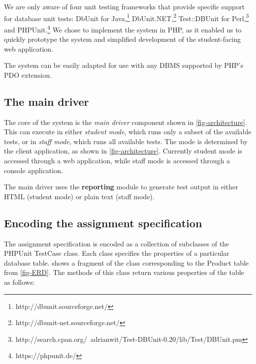\documentclass[sigconf, authordraft, capitalise]{acmart}
\begin{document}
We are only aware of four unit testing frameworks that provide specific support for database unit tests: DbUnit for Java,\footnote{http://dbunit.sourceforge.net/} DbUnit.NET,\footnote{http://dbunit-net.sourceforge.net/} Test::DBUnit for Perl,\footnote{http://search.cpan.org/~adrianwit/Test-DBUnit-0.20/lib/Test/DBUnit.pm} and PHPUnit.\footnote{https://phpunit.de/} We chose to implement the system in PHP, as it enabled us to quickly prototype the system and simplified development of the student-facing web application.

The system can be easily adapted for use with any DBMS supported by PHP's PDO extension.


\subsection{The main driver}

The core of the system is the \emph{main driver} component shown in \cref{fig-architecture}. This can execute in either \emph{student mode}, which runs only a subset of the available tests, or in \emph{staff mode}, which runs all available tests. The mode is determined by the client application, as shown in \ref{fig-architecture}. Currently student mode is accessed through a web application, while staff mode is accessed through a console application.

The main driver uses the \textbf{reporting} module to generate test output in either HTML (student mode) or plain text (staff mode).


\subsection{Encoding the assignment specification}

The assignment specification is encoded as a collection of subclasses of the PHPUnit TestCase class. Each class specifies the properties of a particular database table.  shows a fragment of the class corresponding to the \textsf{Product} table from \cref{fig-ERD}. The methods of this class return various properties of the table as follows:
\end{document}
